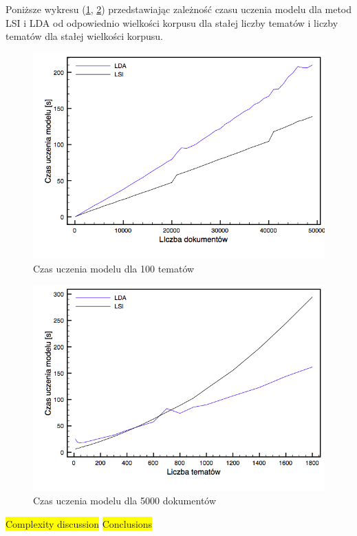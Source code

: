 \documentclass[11pt,a4paper]{article}
\newcommand{\todo}[1]{\colorbox{yellow}{#1}}
\begin{document}
Poniższe wykresu (\ref{time-docs}, \ref{time-topics}) przedstawiając zależność
czasu uczenia modelu dla metod LSI i LDA od odpowiednio wielkości korpusu
dla stałej liczby tematów i liczby tematów dla stałej wielkości korpusu.

\begin{figure}[h]
\includegraphics[width=\linewidth]{gfx/time_docs.png}
\caption{Czas uczenia modelu dla 100 tematów}
\label{time-docs}
\end{figure}

\begin{figure}[h]
\includegraphics[width=\linewidth]{gfx/time_topics.png}
\caption{Czas uczenia modelu dla 5000 dokumentów}
\label{time-topics}
\end{figure}

\todo{Complexity discussion}
\todo{Conclusions}
\end{document}

